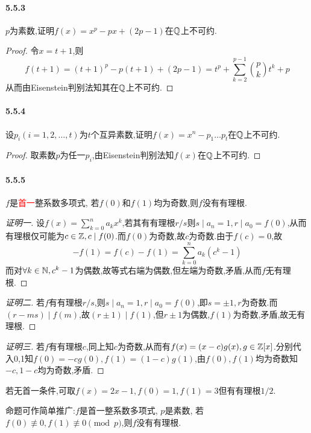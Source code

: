 \documentclass[11pt]{article}
\begin{document}
\paragraph{5.5.3}$p$为素数,证明$f(x)=x^p-px+(2p-1)$在$\mathbb{Q}$上不可约.
\begin{proof}
    令$x=t+1$,则
    $$f(t+1)=(t+1)^p-p(t+1)+(2p-1)=t^p+\sum_{k=2}^{p-1}\binom{p}{k}t^k+p$$
    从而由Eisenstein判别法知其在$\mathbb{Q}$上不可约.
\end{proof}
\paragraph{5.5.4}设$p_i (i=1,2,\dots,t)$为$t$个互异素数,证明$f(x)=x^n-p_1 \dots p_t$在$\mathbb{Q}$上不可约.
\begin{proof}
    取素数$p$为任一$p_i$,由Eisenstein判别法知$f(x)$在$\mathbb{Q}$上不可约.
\end{proof}
\paragraph{5.5.5}$f$是\textcolor{red}{首一}整系数多项式, 若$f(0)$和$f(1)$均为奇数,则$f$没有有理根.
\begin{proof}[证明一]
    设$f(x)=\sum_{k=0}^{n}a_kx^k$,若其有有理根$r/s$则$s\mid a_n=1, r\mid a_0=f(0)$,从而有理根仅可能为$c\in \mathbb{Z}, c\mid f(0)$.而$f(0)$为奇数,故$c$为奇数.由于$f(c)=0$,故
    $$-f(1)=f(c)-f(1)=\sum_{k=0}^{n}a_k(c^k-1)$$
    而对$\forall k\in\mathbb{N}, c^k-1$为偶数,故等式右端为偶数,但左端为奇数,矛盾,从而$f$无有理根.
\end{proof}
\begin{proof}[证明二]
    若$f$有有理根$r/s$,则$s\mid a_n=1, r\mid a_0=f(0)$,即$s=\pm 1, r$为奇数.而$(r-ms)\mid f(m)$,故$(r\pm 1)\mid f(1)$,但$r\pm 1$为偶数,$f(1)$为奇数,矛盾,故无有理根.
\end{proof}
\begin{proof}[证明三]
    若$f$有有理根$c$,同上知$c$为奇数,从而有$f(x)=(x-c)g(x), g\in \mathbb{Z}[x]$.分别代入0,1知$f(0)=-cg(0), f(1)=(1-c)g(1)$,由$f(0), f(1)$均为奇数知$-c, 1-c$均为奇数,矛盾.
\end{proof}
\begin{remark}
    若无首一条件,可取$f(x)=2x-1, f(0)=1, f(1)=3$但有有理根$1/2$.
\end{remark}
\begin{remark}
    命题可作简单推广:$f$是首一整系数多项式, $p$是素数, 若$f(0)\not\equiv 0, f(1)\not\equiv 0 \pmod p$,则$f$没有有理根.
\end{remark}
\end{document}
